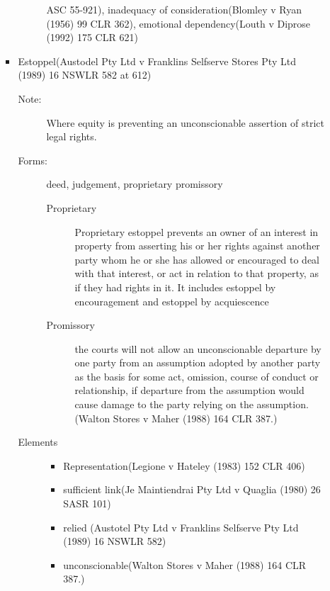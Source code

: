 \begin{itemize}
\begin{itemize}
\begin{itemize}
\begin{description}
ASC 55-921), inadequacy of consideration(Blomley v Ryan (1956) 99 CLR 362), emotional dependency(Louth v Diprose (1992) 175 CLR 621)
                        \end{description}
                    \item Estoppel(Austodel Pty Ltd v Franklins Selfserve Stores Pty Ltd (1989) 16 NSWLR 582 at 612)
                        \begin{description}
                            \item[Note:] Where equity is preventing an unconscionable assertion of strict legal rights. 
                            \item[Forms:] deed, judgement, proprietary promissory
                                \begin{description}
                                    \item[Proprietary] Proprietary estoppel prevents an owner of an interest in property from asserting his or her rights against another party whom he or she has allowed or encouraged to deal with that interest, or act in relation to that property, as if they had rights in it. It includes estoppel by encouragement and estoppel by acquiescence
                                    \item[Promissory] the courts will not allow an unconscionable departure by one party from an assumption adopted by another party as the basis for some act, omission, course of conduct or relationship, if departure from the assumption would cause damage to the party relying on the assumption. (Walton Stores v Maher (1988) 164 CLR 387.)
                                \end{description}
                            \item[Elements]
                                \begin{itemize}
                                    \item Representation(Legione v Hateley (1983) 152 CLR 406)
                                    \item sufficient link(Je Maintiendrai Pty Ltd v Quaglia (1980) 26 SASR 101)
                                    \item relied (Austotel Pty Ltd v Franklins Selfserve Pty Ltd (1989) 16 NSWLR 582)
                                    \item unconscionable(Walton Stores v Maher (1988) 164 CLR 387.)
                                \end{itemize}
                        \end{description}

\end{itemize}
\end{itemize}
\end{itemize}
